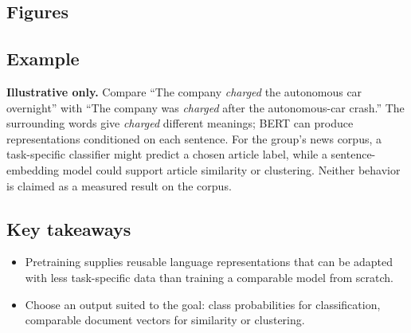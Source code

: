 \documentclass[11pt]{article}
\begin{document}
\subsection*{Figures}
\begin{center}
\end{center}

\subsection*{Example}
\textbf{Illustrative only.} Compare ``The company \emph{charged} the autonomous car overnight'' with ``The company was \emph{charged} after the autonomous-car crash.'' The surrounding words give \emph{charged} different meanings; BERT can produce representations conditioned on each sentence. For the group's news corpus, a task-specific classifier might predict a chosen article label, while a sentence-embedding model could support article similarity or clustering. Neither behavior is claimed as a measured result on the corpus.

\subsection*{Key takeaways}
\begin{itemize}
  \item Pretraining supplies reusable language representations that can be adapted with less task-specific data than training a comparable model from scratch.
  \item Choose an output suited to the goal: class probabilities for classification, comparable document vectors for similarity or clustering.
\end{itemize}
\end{document}
